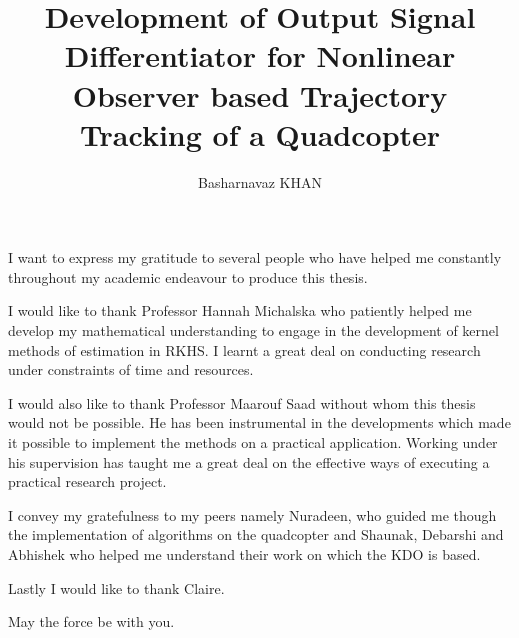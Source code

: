 \documentclass[letterpaper%
, twoside%
, 12pt%
,memoire%
, english%
,creativecommons,hyperref%
]{thETS}
\title{Development of Output Signal Differentiator for Nonlinear Observer based Trajectory Tracking of a Quadcopter}
\author{Basharnavaz KHAN}
\begin{document}
\maketitle
\presentjury


\begin{acknowledgements}
I want to express my gratitude to several people who have helped me constantly throughout my academic endeavour to produce this thesis.

I would like to thank Professor Hannah Michalska who patiently helped me develop my mathematical understanding to engage in the development of kernel methods of estimation in RKHS. I learnt a great deal on conducting research under constraints of time and resources.

I would also like to thank Professor Maarouf Saad without whom this thesis would not be possible. He has been instrumental in the developments which made it possible to implement the methods on a practical application. Working under his supervision has taught me a great deal on the effective ways of executing a practical research project.

I convey my gratefulness to my peers namely Nuradeen, who guided me though the implementation of algorithms on the quadcopter and Shaunak, Debarshi and Abhishek who helped me understand their work on which the KDO is based. 

Lastly I would like to thank Claire. 

May the force be with you.
\end{acknowledgements}
\end{document}
